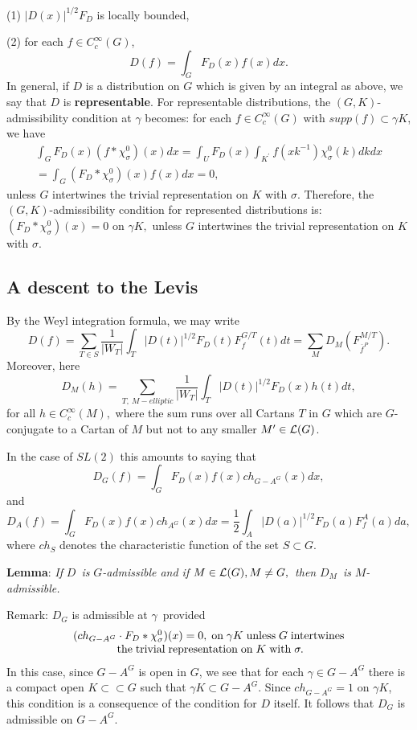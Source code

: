 (1) $|D(x)|^{1/2}F_D$ is locally bounded,

(2) for each $f\in C_c^\infty (G)$, 
\[
D(f)=\int_GF_D(x)f(x)dx. 
\]
In general, if $D$ is a distribution on $G$ which is given by an integral as
above, we say that $D$ is {\bf representable}. For representable
distributions, the $(G,K)$-admissibility condition at $\gamma $ becomes: for
each $f\in C_c^\infty (G)$ with $supp(f)\subset \gamma K$, we have 
\[
\begin{array}{c}
\int_GF_D(x)(f*\chi _\sigma ^0)(x)dx=\int_UF_D(x)\int_{K^{\prime
}}f(xk^{-1})\chi _\sigma ^0(k)dkdx \\ 
=\int_G(F_D*\chi _\sigma ^0)(x)f(x)dx=0,
\end{array}
\]
unless $G$ intertwines the trivial representation on $K$ with $\sigma $.
Therefore, the $(G,K)$-admissibility condition for represented distributions
is: $(F_D*\chi _\sigma ^0)(x)=0$ on $\gamma K,$ unless $G$ intertwines the
trivial representation on $K$ with $\sigma $.

\subsection{A descent to the Levis}

By the Weyl integration formula, we may write 
\[
D(f)=\sum_{T\in S}{\frac 1{|W_T|}}\int_T|D(t)|^{1/2}F_D(t)F_f^{G/T}(t)dt=%
\sum_MD_M(F_{\overline{f}^P}^{M/T}). 
\]
Moreover, here 
\[
D_M(h)=\sum_{T,\ M-elliptic } {\frac 1{|W_T|}}%
\int_T|D(t)|^{1/2}F_D(x)h(t)dt, 
\]
for all $h\in C_c^\infty (M),$ where the sum runs over all Cartans $T$ in $G$
which are $G$-conjugate to a Cartan of $M$ but not to any smaller $M^{\prime
}\in {\cal L}(G)$.

In the case of $SL(2)$ this amounts to saying that 
\[
D_G(f)=\int_GF_D(x)f(x)ch_{G-A^G}(x)dx, 
\]
and 
\[
D_A(f)=\int_GF_D(x)f(x)ch_{A^G}(x)dx=\frac
12\int_A|D(a)|^{1/2}F_D(a)F_f^A(a)da, 
\]
where $ch_S$ denotes the characteristic function of the set $S\subset G$.

{\bf Lemma}{\sc :} {\em If }$D${\em \ is }$G${\em -admissible and if }$M\in 
{\cal L}(G),M\neq G,${\em \ then }$D_M${\em \ is }$M${\em -admissible.}

{\sc Remark:} $D_G$ is admissible at $\gamma $\ provided 
\[
\begin{array}{c}
(ch_{G-A^G}\cdot F_D*\chi _\sigma ^0)(x)=0,\; {\rm on\;}\gamma K\;{\rm %
unless\;}G\;{\rm intertwines} \\ 
{\rm \;the\;trivial\;representation\;on\;}K\;{\rm with}\;\sigma .
\end{array}
\]
In this case, since $G-A^G$ is open in $G$, we see that for each $\gamma \in
G-A^G$ there is a compact open $K\subset \subset G$ such that $\gamma
K\subset G-A^G$. Since $ch_{G-A^G}=1$ on $\gamma K$, this condition is a
consequence of the condition for $D$ itself. It follows that $D_G$ is
admissible on $G-A^G$.

